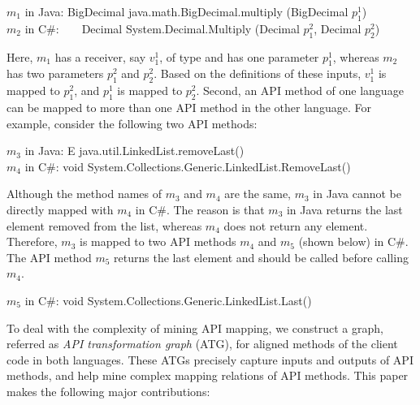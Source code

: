 \begin{CodeOut}
$m_1$ in Java: BigDecimal java.math.BigDecimal.multiply (BigDecimal $p_1^1$)\\
\hspace*{0.12in}$m_2$ in C\#:\ \ \ \  Decimal
System.Decimal.Multiply (Decimal $p_1^2$, Decimal $p_2^2$)
\end{CodeOut}

Here, $m_1$ has a receiver, say $v_1^1$, of type 
and has one parameter $p_1^1$, whereas $m_2$ has two parameters $p_1^2$
and $p_2^2$. Based on the definitions of these inputs, $v_1^1$ is
mapped to $p_1^2$, and $p_1^1$ is mapped to $p_2^2$. Second, an API
method of one language can be mapped to more than one API method in the
other language. For example, consider the following two API methods:

\begin{CodeOut}
$m_3$ in Java: E java.util.LinkedList.removeLast()\\
\hspace*{0.12in}$m_4$ in C\#: void System.Collections.Generic.LinkedList.RemoveLast()
\end{CodeOut}

Although the method names of $m_3$ and $m_4$ are the same, $m_3$ in Java
cannot be directly mapped with $m_4$ in C\#. The reason is that $m_3$ in Java
returns the last element removed from the list, whereas $m_4$ does not return any
element. Therefore, $m_3$ is mapped to two API methods $m_4$ and $m_5$ (shown below) in C\#.
The API method $m_5$ returns the last element and should be called before calling $m_4$.

\begin{CodeOut}
$m_5$ in C\#: void System.Collections.Generic.LinkedList.Last()
\end{CodeOut}

To deal with the complexity of mining API mapping, we construct a
graph, referred as \emph{API transformation graph} (ATG), for
aligned methods of the client code in both languages. These ATGs
precisely capture inputs and outputs of API methods, and help mine
complex mapping relations of API methods. This paper makes the
following major contributions:

